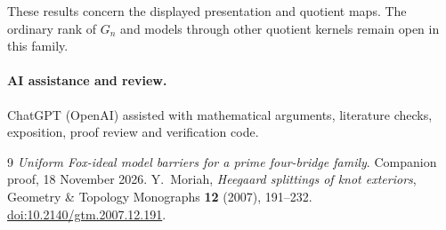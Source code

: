 \documentclass[11pt]{article}
\begin{document}
These results concern the displayed presentation and quotient maps.
The ordinary rank of $G_n$ and models through other quotient kernels
remain open in this family.

\paragraph{AI assistance and review.}
ChatGPT (OpenAI) assisted with mathematical arguments, literature checks,
exposition, proof review and verification code.

\begin{thebibliography}{9}
 \emph{Uniform Fox-ideal model barriers for a prime
four-bridge family}. Companion proof, 18 November 2026.
 Y.~Moriah, \emph{Heegaard splittings of knot
exteriors}, Geometry \& Topology Monographs \textbf{12} (2007),
191--232. \href{https://doi.org/10.2140/gtm.2007.12.191}{doi:10.2140/gtm.2007.12.191}.
\end{thebibliography}
\end{document}
